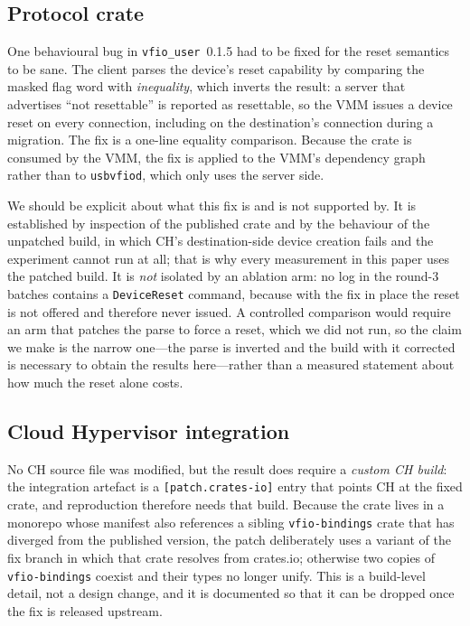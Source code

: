 \documentclass[10pt,conference]{IEEEtran}
\newcommand{\code}[1]{\texttt{#1}}
\begin{document}
\subsection{Protocol crate}
\label{sec:crate}
One behavioural bug in \code{vfio\_user}~0.1.5 had to be fixed for the reset
semantics to be sane. The client parses the device's reset capability by
comparing the masked flag word with \emph{inequality}, which inverts the result:
a server that advertises ``not resettable'' is reported as resettable, so the
VMM issues a device reset on every connection, including on the destination's
connection during a migration. The fix is a one-line equality comparison. Because the
crate is consumed by the VMM, the fix is applied to the VMM's dependency graph
rather than to \code{usbvfiod}, which only uses the server side.

We should be explicit about what this fix is and is not supported by. It is
established by inspection of the published crate and by the behaviour of the
unpatched build, in which CH's destination-side device creation fails and the
experiment cannot run at all; that is why every measurement in this paper uses
the patched build. It is \emph{not} isolated by an ablation arm: no log in the
round-3 batches contains a \code{DeviceReset} command, because with the fix in
place the reset is not offered and therefore never issued. A controlled
comparison would require an arm that patches the parse to force a reset, which
we did not run, so the claim we make is the narrow one---the parse is inverted
and the build with it corrected is necessary to obtain the results here---rather
than a measured statement about how much the reset alone costs.

\subsection{Cloud Hypervisor integration}
No CH source file was modified, but the result does require a \emph{custom CH
build}: the integration artefact is a \code{[patch.crates-io]} entry that
points CH at the fixed crate, and reproduction therefore needs that build. Because the
crate lives in a monorepo whose manifest also references a sibling
\code{vfio-bindings} crate that has diverged from the published version, the
patch deliberately uses a variant of the fix branch in which that crate resolves
from crates.io; otherwise two copies of \code{vfio-bindings} coexist and their
types no longer unify. This is a build-level detail, not a design change, and it
is documented so that it can be dropped once the fix is released upstream.
\end{document}
